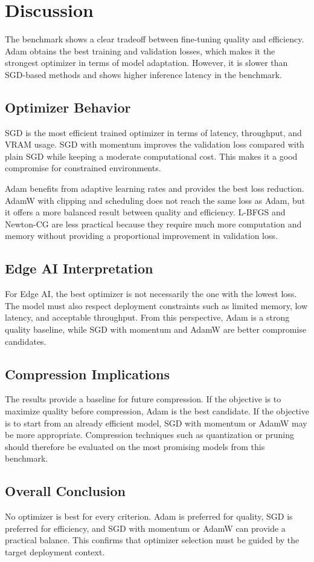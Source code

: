 \chapter{Discussion}

\vspace*{0.3cm}

The benchmark shows a clear tradeoff between fine-tuning quality and efficiency.
Adam obtains the best training and validation losses, which makes it the strongest
optimizer in terms of model adaptation. However, it is slower than SGD-based
methods and shows higher inference latency in the benchmark.

\section{Optimizer Behavior}

SGD is the most efficient trained optimizer in terms of latency, throughput, and
VRAM usage. SGD with momentum improves the validation loss compared with plain
SGD while keeping a moderate computational cost. This makes it a good compromise
for constrained environments.

\vspace*{0.15cm}

Adam benefits from adaptive learning rates and provides the best loss reduction.
AdamW with clipping and scheduling does not reach the same loss as Adam, but it
offers a more balanced result between quality and efficiency. L-BFGS and
Newton-CG are less practical because they require much more computation and
memory without providing a proportional improvement in validation loss.

\section{Edge AI Interpretation}

For Edge AI, the best optimizer is not necessarily the one with the lowest loss.
The model must also respect deployment constraints such as limited memory, low
latency, and acceptable throughput. From this perspective, Adam is a strong
quality baseline, while SGD with momentum and AdamW are better compromise
candidates.

\section{Compression Implications}

The results provide a baseline for future compression. If the objective is to
maximize quality before compression, Adam is the best candidate. If the objective
is to start from an already efficient model, SGD with momentum or AdamW may be
more appropriate. Compression techniques such as quantization or pruning should
therefore be evaluated on the most promising models from this benchmark.

\section{Overall Conclusion}

No optimizer is best for every criterion. Adam is preferred for quality, SGD is
preferred for efficiency, and SGD with momentum or AdamW can provide a practical
balance. This confirms that optimizer selection must be guided by the target
deployment context.
